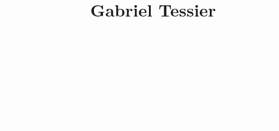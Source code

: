\documentclass[11pt,oneside,a4paper,titlepage]{article}
\title{Gabriel Tessier}
\date{}
\begin{document}
\begin{tcolorbox}
  \vspace*{\fill}
  \begin{center}
    \begin{minipage}{.9\textwidth}
      \begin{center}
        \Huge{\textcolor{white}{Gabriel TESSIER}}\\
      \end{center}
      \begin{center}
        \Large{\textcolor{white}{\emph{Student at the Ensimag engineering school in $2^{nd}$ year}}}\\
      \end{center}
      \begin{center}
        \textcolor{white}{I'm a motivated and enthusiastic individual with a strong interest in programming. I'm looking for a role that uses my skills and develops them further.}
      \end{center}
    \end{minipage}
  \end{center}
\end{tcolorbox}
\end{document}
